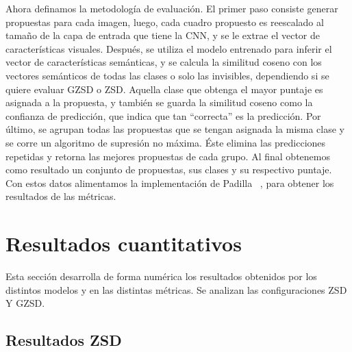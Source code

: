 Ahora definamos la metodología de evaluación. El primer paso consiste generar propuestas para cada imagen, luego, cada cuadro propuesto es reescalado al tamaño de la capa de entrada que tiene la CNN, y se le extrae el vector de características visuales. Después, se utiliza el modelo entrenado para inferir el vector de características semánticas, y se calcula la similitud coseno con los vectores semánticos de todas las clases o solo las invisibles, dependiendo si se quiere evaluar GZSD o ZSD. Aquella clase que obtenga el mayor puntaje es asignada a la propuesta, y también se guarda la similitud coseno como la confianza de predicción, que indica que tan ``correcta'' es la predicción. Por último, se agrupan todas las propuestas que se tengan asignada la misma clase y se corre un algoritmo de supresión no máxima. Éste elimina las predicciones repetidas y retorna las mejores propuestas de cada grupo. Al final obtenemos como resultado un conjunto de propuestas, sus clases y su respectivo puntaje. Con estos datos alimentamos la implementación de Padilla \etal~\cite{padilla2020survey}, para obtener los resultados de las métricas.

\section{Resultados cuantitativos} \label{sec:resultadoscuantitativos}

Esta sección desarrolla de forma numérica los resultados obtenidos por los distintos modelos y en las distintas métricas. Se analizan las configuraciones ZSD Y GZSD.

\subsection{Resultados ZSD}

